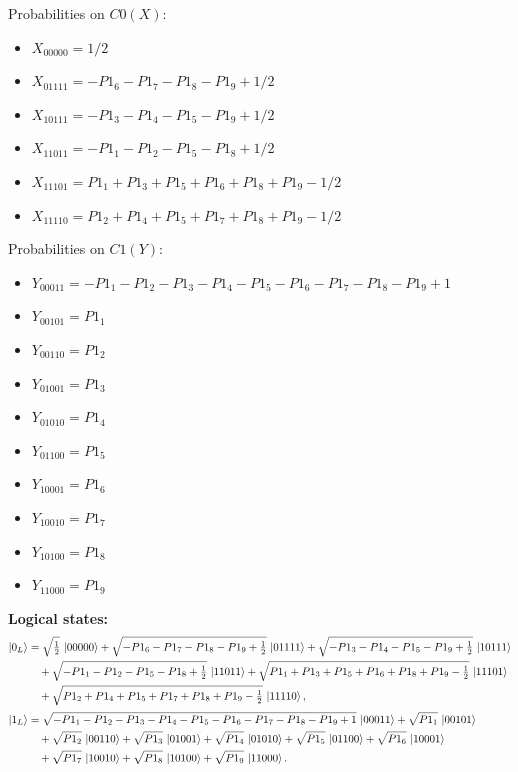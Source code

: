\documentclass[11pt]{article}
\begin{document}
Probabilities on $C0 (X)$:
\begin{itemize}
    \item $X_{00000} = 1/2$
    \item $X_{01111} = -P1_6 - P1_7 - P1_8 - P1_9 + 1/2$
    \item $X_{10111} = -P1_3 - P1_4 - P1_5 - P1_9 + 1/2$
    \item $X_{11011} = -P1_1 - P1_2 - P1_5 - P1_8 + 1/2$
    \item $X_{11101} = P1_1 + P1_3 + P1_5 + P1_6 + P1_8 + P1_9 - 1/2$
    \item $X_{11110} = P1_2 + P1_4 + P1_5 + P1_7 + P1_8 + P1_9 - 1/2$
\end{itemize}

Probabilities on $C1 (Y)$:
\begin{itemize}
    \item $Y_{00011} = -P1_1 - P1_2 - P1_3 - P1_4 - P1_5 - P1_6 - P1_7 - P1_8 - P1_9 + 1$
    \item $Y_{00101} = P1_1$
    \item $Y_{00110} = P1_2$
    \item $Y_{01001} = P1_3$
    \item $Y_{01010} = P1_4$
    \item $Y_{01100} = P1_5$
    \item $Y_{10001} = P1_6$
    \item $Y_{10010} = P1_7$
    \item $Y_{10100} = P1_8$
    \item $Y_{11000} = P1_9$
\end{itemize}

\noindent\textbf{Logical states:}
\begin{align*}
\ket{0_L} &= \sqrt{\tfrac{1}{2}}\,\ket{00000} + \sqrt{-P1_6 - P1_7 - P1_8 - P1_9 + \tfrac{1}{2}}\,\ket{01111} + \sqrt{-P1_3 - P1_4 - P1_5 - P1_9 + \tfrac{1}{2}}\,\ket{10111} \\
&\quad + \sqrt{-P1_1 - P1_2 - P1_5 - P1_8 + \tfrac{1}{2}}\,\ket{11011} + \sqrt{P1_1 + P1_3 + P1_5 + P1_6 + P1_8 + P1_9 - \tfrac{1}{2}}\,\ket{11101}\\
&\quad + \sqrt{P1_2 + P1_4 + P1_5 + P1_7 + P1_8 + P1_9 - \tfrac{1}{2}}\,\ket{11110},
\\[2pt]
\ket{1_L} &= \sqrt{-P1_1 - P1_2 - P1_3 - P1_4 - P1_5 - P1_6 - P1_7 - P1_8 - P1_9 + 1}\,\ket{00011} + \sqrt{P1_1}\,\ket{00101}\\
&\quad + \sqrt{P1_2}\,\ket{00110} + \sqrt{P1_3}\,\ket{01001} + \sqrt{P1_4}\,\ket{01010} + \sqrt{P1_5}\,\ket{01100} + \sqrt{P1_6}\,\ket{10001}\\
&\quad + \sqrt{P1_7}\,\ket{10010} + \sqrt{P1_8}\,\ket{10100} + \sqrt{P1_9}\,\ket{11000}.
\end{align*}
\end{document}
